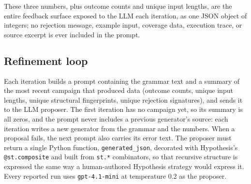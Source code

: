 These three numbers, plus outcome counts and unique input lengths, are the
entire feedback surface exposed to the LLM each iteration, as one JSON object
of integers; no rejection message, example input, coverage data, execution
trace, or source excerpt is ever included in the prompt.

\subsection{Refinement loop}
Each iteration builds a prompt containing the grammar text and a summary of
the most recent campaign that produced data (outcome counts, unique input
lengths, unique structural fingerprints, unique rejection signatures), and
sends it to the LLM proposer. The first iteration has no campaign yet, so its
summary is all zeros, and the prompt never includes a previous generator's
source: each iteration writes a new generator from the grammar and the
numbers. When a proposal fails, the next prompt also carries its error text. The proposer must return
a single Python function, \texttt{generated\_json}, decorated with
Hypothesis's \texttt{@st.composite} and built from \texttt{st.*}
combinators, so that recursive structure is expressed the same way a
human-authored Hypothesis strategy would express it. Every reported run
uses \texttt{gpt-4.1-mini} at temperature 0.2 as the proposer.

